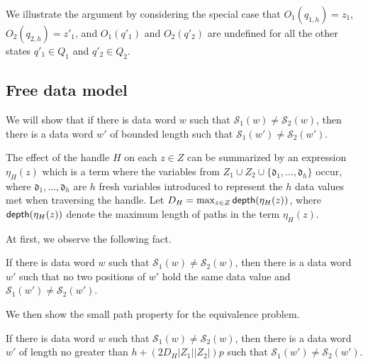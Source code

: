 \documentclass[runningheads,a4paper]{llncs}
\newcommand{\hide}[1]{}
\newcommand\dom{\mathsf{dom}}
\newcommand\nat{\mathbb{N}}
\newcommand\Ss{\mathcal{S}}
\newcommand\vard{\mathfrak{d}}
\begin{document}
We illustrate the argument by considering the special case that $O_1(q_{1,h})=z_1$, $O_2(q_{2,h})=z'_1$, and $O_1(q'_1)$ and $O_2(q'_2)$ are undefined  for all the other states $q'_1  \in Q_1$ and $q'_2 \in Q_2$.

 
\subsection{Free data model}

\hide{
For $i=1,2$, define 
$$I_{\Ss_i} = \{j \mid 1 \le j \le h, q_{i,j} \in \dom(O) \} \cup \{h + n p + j \mid n \in \nat, 0 \le j < p, q_{i, h+j} \in \dom(O)\}.$$

\smallskip

\noindent {\bf Step I}: If $I_{\Ss_1} \neq I_{\Ss_2}$, then return false. Otherwise, go to Step II.

\smallskip
}


We will show that if there is data word $w$ such that $\Ss_1(w) \neq \Ss_2(w)$, then there is a data word $w'$ of bounded length such that $\Ss_1(w') \neq \Ss_2(w')$.

The effect of the handle $H$ on each $z \in Z$ can be summarized by an expression $\eta_H(z)$ which is a term where the variables from $Z_1 \cup Z_2 \cup \{\vard_1,\dots, \vard_h\}$ occur, where $\vard_1,\dots, \vard_h$ are $h$ fresh variables introduced to represent the $h$ data values met when traversing the handle.  Let $D_H = \max_{z \in Z} {\sf depth}(\eta_H(z))$, where ${\sf depth}(\eta_H(z))$ denote the  maximum length of paths in the term $\eta_H(z)$.

At first, we observe the following fact.

\begin{proposition}\label{prop-distinct}
If there is data word $w$ such that $\Ss_1(w) \neq \Ss_2(w)$, then there is a data word $w'$ such that  no two positions of $w'$ hold the same data value and $\Ss_1(w') \neq \Ss_2(w')$.
\end{proposition}

\newcommand\node{{\sf Node}}

\newcommand\dif{{\sf DIF}}

\newcommand\var{{\sf var}}

We then show the small path property for the equivalence problem.

\begin{proposition}\label{prop-free-bnd}
If there is data word $w$ such that $\Ss_1(w) \neq \Ss_2(w)$, then there is a data word $w'$ of length no greater than $h+(2D_H |Z_1|  |Z_2|)p$  such that $\Ss_1(w') \neq \Ss_2(w')$.
\end{proposition}
\end{document}
